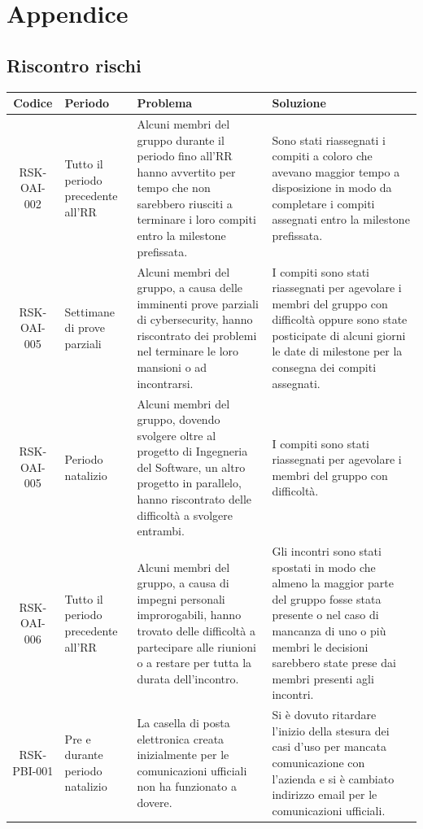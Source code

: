 \section{Appendice}

	\subsection{Riscontro rischi}

		\begin{center}
			\begin{longtable}{|c|p{3cm}|p{4cm}|p{4cm}|}
			\hline
			\rowcolor{lighter-grayer}
			\textbf{Codice} & \textbf{Periodo} & \textbf{Problema} & \textbf{Soluzione} \\
			\hline
			\endfirsthead

			\hline
			RSK-OAI-002 & Tutto il periodo precedente all'RR & Alcuni membri del gruppo durante il periodo fino all'RR hanno avvertito per tempo che non sarebbero riusciti a terminare i loro compiti entro la milestone prefissata. & Sono stati riassegnati i compiti a coloro che avevano maggior tempo a disposizione in modo da completare i compiti assegnati entro la milestone prefissata. \\
			\hline
			\hline
			RSK-OAI-005 & Settimane di prove parziali & Alcuni membri del gruppo, a causa delle imminenti prove parziali di cybersecurity, hanno riscontrato dei problemi nel terminare le loro mansioni o ad incontrarsi. & I compiti sono stati riassegnati per agevolare i membri del gruppo con difficoltà oppure sono state posticipate di alcuni giorni le date di milestone per la consegna dei compiti assegnati.  \\
			\hline
			\hline
			RSK-OAI-005 & Periodo natalizio & Alcuni membri del gruppo, dovendo svolgere oltre al progetto di Ingegneria del Software, un altro progetto in parallelo, hanno riscontrato delle difficoltà a svolgere entrambi. & I compiti sono stati riassegnati per agevolare i membri del gruppo con difficoltà.  \\
			\hline
			\hline
			RSK-OAI-006 & Tutto il periodo precedente all'RR & Alcuni membri del gruppo, a causa di impegni personali improrogabili, hanno trovato delle difficoltà a partecipare alle riunioni o a restare per tutta la durata dell'incontro. & Gli incontri sono stati spostati in modo che almeno la maggior parte del gruppo fosse stata presente o nel caso di mancanza di uno o più membri le decisioni sarebbero state prese dai membri presenti agli incontri. \\
			\hline
			\hline
			RSK-PBI-001 & Pre e durante periodo natalizio & La casella di posta elettronica creata inizialmente per le comunicazioni ufficiali non ha funzionato a dovere. & Si è dovuto ritardare l'inizio della stesura dei casi d'uso per mancata comunicazione con l'azienda e si è cambiato indirizzo email per le comunicazioni ufficiali. \\
			\hline

			\end{longtable}
		\end{center}

